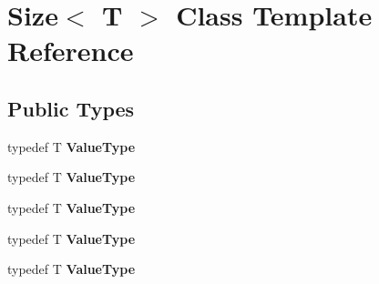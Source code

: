\hypertarget{class_size}{
\section{Size$<$ T $>$ Class Template Reference}
\label{class_size}
}
\subsection*{Public Types}
\begin{DoxyCompactItemize}
\item 
\hypertarget{class_size_a0005a39a6d8bbc7add41073925914355}{
typedef T {\bfseries ValueType}}
\label{class_size_a0005a39a6d8bbc7add41073925914355}

\item 
\hypertarget{class_size_a0005a39a6d8bbc7add41073925914355}{
typedef T {\bfseries ValueType}}
\label{class_size_a0005a39a6d8bbc7add41073925914355}

\item 
\hypertarget{class_size_a0005a39a6d8bbc7add41073925914355}{
typedef T {\bfseries ValueType}}
\label{class_size_a0005a39a6d8bbc7add41073925914355}

\item 
\hypertarget{class_size_a0005a39a6d8bbc7add41073925914355}{
typedef T {\bfseries ValueType}}
\label{class_size_a0005a39a6d8bbc7add41073925914355}

\item 
\hypertarget{class_size_a0005a39a6d8bbc7add41073925914355}{
typedef T {\bfseries ValueType}}
\label{class_size_a0005a39a6d8bbc7add41073925914355}

\end{DoxyCompactItemize}
